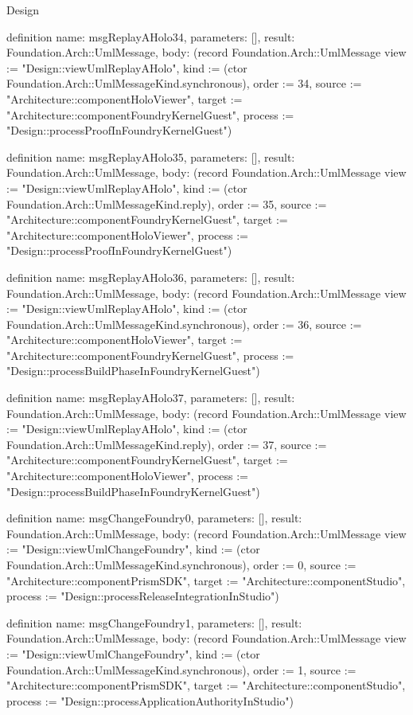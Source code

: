 \begin{lexlean}{Design}
\begin{semanticmodule}
definition{
  name: msgReplayAHolo34,
  parameters: [],
  result: Foundation.Arch::UmlMessage,
  body: (record Foundation.Arch::UmlMessage {view := "Design::viewUmlReplayAHolo", kind := (ctor Foundation.Arch::UmlMessageKind.synchronous), order := 34, source := "Architecture::componentHoloViewer", target := "Architecture::componentFoundryKernelGuest", process := "Design::processProofInFoundryKernelGuest"})
}

definition{
  name: msgReplayAHolo35,
  parameters: [],
  result: Foundation.Arch::UmlMessage,
  body: (record Foundation.Arch::UmlMessage {view := "Design::viewUmlReplayAHolo", kind := (ctor Foundation.Arch::UmlMessageKind.reply), order := 35, source := "Architecture::componentFoundryKernelGuest", target := "Architecture::componentHoloViewer", process := "Design::processProofInFoundryKernelGuest"})
}

definition{
  name: msgReplayAHolo36,
  parameters: [],
  result: Foundation.Arch::UmlMessage,
  body: (record Foundation.Arch::UmlMessage {view := "Design::viewUmlReplayAHolo", kind := (ctor Foundation.Arch::UmlMessageKind.synchronous), order := 36, source := "Architecture::componentHoloViewer", target := "Architecture::componentFoundryKernelGuest", process := "Design::processBuildPhaseInFoundryKernelGuest"})
}

definition{
  name: msgReplayAHolo37,
  parameters: [],
  result: Foundation.Arch::UmlMessage,
  body: (record Foundation.Arch::UmlMessage {view := "Design::viewUmlReplayAHolo", kind := (ctor Foundation.Arch::UmlMessageKind.reply), order := 37, source := "Architecture::componentFoundryKernelGuest", target := "Architecture::componentHoloViewer", process := "Design::processBuildPhaseInFoundryKernelGuest"})
}

definition{
  name: msgChangeFoundry0,
  parameters: [],
  result: Foundation.Arch::UmlMessage,
  body: (record Foundation.Arch::UmlMessage {view := "Design::viewUmlChangeFoundry", kind := (ctor Foundation.Arch::UmlMessageKind.synchronous), order := 0, source := "Architecture::componentPrismSDK", target := "Architecture::componentStudio", process := "Design::processReleaseIntegrationInStudio"})
}

definition{
  name: msgChangeFoundry1,
  parameters: [],
  result: Foundation.Arch::UmlMessage,
  body: (record Foundation.Arch::UmlMessage {view := "Design::viewUmlChangeFoundry", kind := (ctor Foundation.Arch::UmlMessageKind.synchronous), order := 1, source := "Architecture::componentPrismSDK", target := "Architecture::componentStudio", process := "Design::processApplicationAuthorityInStudio"})
}


\end{semanticmodule}
\end{lexlean}
